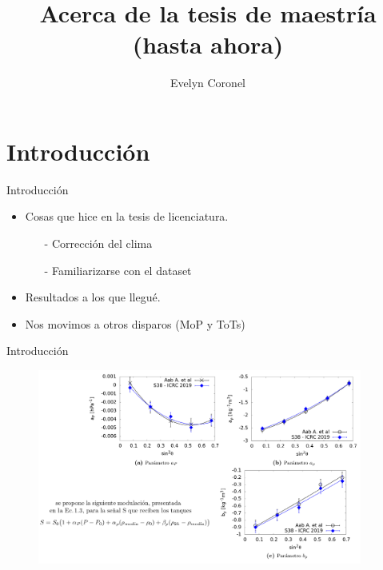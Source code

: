 \documentclass{beamer}
\title[Avance]{Acerca de la tesis de maestría\\(hasta ahora)}
\author{Evelyn Coronel}
\institute{Partículas y Campos - Centro Atómico Bariloche}
\begin{document}
\begin{frame}
  \titlepage
\end{frame}


\section{Introducción}

\begin{frame}{Introducción}

\begin{itemize}
  \item Cosas que hice en la tesis de licenciatura.
  \begin{itemize}
  	\item[-] Corrección del clima
  	\item[-] Familiarizarse con el dataset
  \end{itemize}
  \item Resultados a los que llegué.
  \item Nos movimos a otros disparos (MoP y ToTs)
\end{itemize}

\end{frame}

\begin{frame}{Introducción}

\begin{figure}[htbp]
  \centering
  \includegraphics[width=0.95\textwidth]{tesis.png}
\end{figure}

\end{frame}
\end{document}

